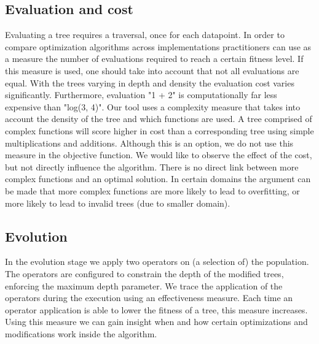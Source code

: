 \subsection{Evaluation and cost}
Evaluating a tree requires a traversal, once for each datapoint. In order to compare optimization algorithms across implementations practitioners can use as a measure the number of evaluations required to reach a certain fitness level. If this measure is used, one should take into account that not all evaluations are equal. With the trees varying in depth and density the evaluation cost varies significantly. Furthermore, evaluation "1 + 2" is computationally far less expensive than "log(3, 4)".
Our tool uses a complexity measure that takes into account the density of the tree and which functions are used. A tree comprised of complex functions will score higher in cost than a corresponding tree using simple multiplications and additions. Although this is an option, we do not use this measure in the objective function. We would like to observe the effect of the cost, but not directly influence the algorithm. There is no direct link between more complex functions and an optimal solution. In certain domains the argument can be made that more complex functions are more likely to lead to overfitting, or more likely to lead to invalid trees (due to smaller domain).

\subsection{Evolution}
In the evolution stage we apply two operators on (a selection of) the population. The operators are configured to constrain the depth of the modified trees, enforcing the maximum depth parameter.
We trace the application of the operators during the execution using an effectiveness measure. Each time an operator application is able to lower the fitness of a tree, this measure increases. Using this measure we can gain insight when and how certain optimizations and modifications work inside the algorithm.

